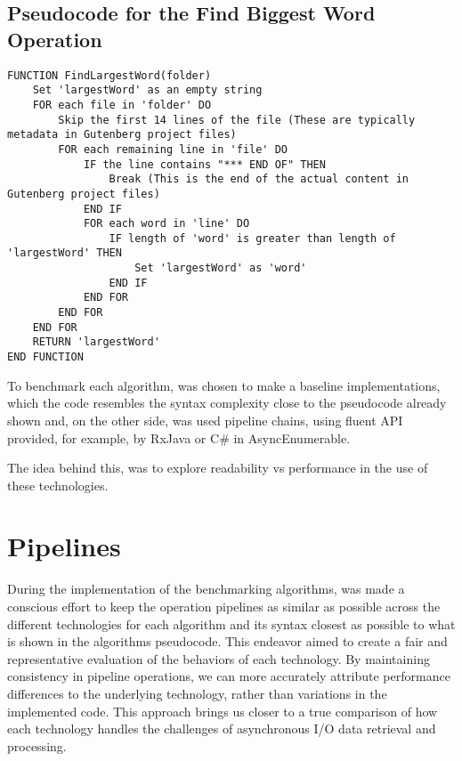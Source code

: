 \subsection*{Pseudocode for the Find Biggest Word Operation}
\begin{lstlisting}[language={}, caption={Pseudocode for FindLargestWord function}, label={lst:findlargestword}]
FUNCTION FindLargestWord(folder)
    Set 'largestWord' as an empty string
    FOR each file in 'folder' DO
        Skip the first 14 lines of the file (These are typically metadata in Gutenberg project files)
        FOR each remaining line in 'file' DO
            IF the line contains "*** END OF" THEN
                Break (This is the end of the actual content in Gutenberg project files)
            END IF
            FOR each word in 'line' DO
                IF length of 'word' is greater than length of 'largestWord' THEN
                    Set 'largestWord' as 'word'
                END IF
            END FOR
        END FOR
    END FOR
    RETURN 'largestWord'
END FUNCTION
\end{lstlisting}

To benchmark each algorithm, was chosen to make a baseline implementations, which the code resembles the syntax complexity close to the pseudocode already shown and, on the other side, was used pipeline chains, using fluent API provided, for example, by RxJava or C\# in AsyncEnumerable.

The idea behind this, was to explore readability vs performance in the use of these technologies.


\section{Pipelines}
\label{sec:pipeline_implementations}

During the implementation of the benchmarking algorithms, was made a conscious effort to keep the operation pipelines as similar as possible across the different technologies for each algorithm and its syntax closest as possible to what is shown in the algorithms pseudocode. This endeavor aimed to create a fair and representative evaluation of the behaviors of each technology. By maintaining consistency in pipeline operations, we can more accurately attribute performance differences to the underlying technology, rather than variations in the implemented code. This approach brings us closer to a true comparison of how each technology handles the challenges of asynchronous I/O data retrieval and processing.

